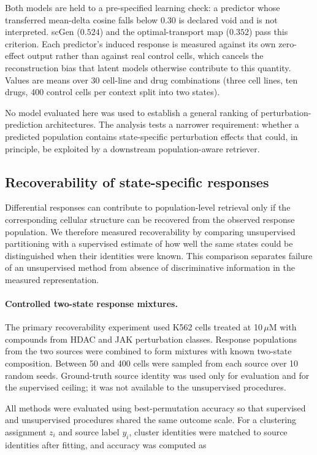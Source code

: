 \documentclass[11pt,letterpaper]{article}
\begin{document}
Both models are held to a pre-specified learning check: a predictor whose transferred mean-delta
cosine falls below 0.30 is declared void and is not interpreted. scGen ($0.524$) and the
optimal-transport map ($0.352$) pass this criterion. Each
predictor's induced response is measured against its own zero-effect output rather than against
real control cells, which cancels the reconstruction bias that latent models otherwise contribute
to this quantity. Values are means over 30 cell-line and drug combinations (three cell lines, ten
drugs, 400 control cells per context split into two states).

No model evaluated here was used to establish a general ranking of perturbation-prediction
architectures. The analysis tests a narrower requirement: whether a predicted population contains
state-specific perturbation effects that could, in principle, be exploited by a downstream
population-aware retriever.



\subsection*{Recoverability of state-specific responses}

Differential responses can contribute to population-level retrieval only if the corresponding
cellular structure can be recovered from the observed response population. We therefore measured
recoverability by comparing unsupervised partitioning with a supervised estimate of how well the
same states could be distinguished when their identities were known. This comparison separates
failure of an unsupervised method from absence of discriminative information in the measured
representation.

\paragraph{Controlled two-state response mixtures.}
The primary recoverability experiment used K562 cells treated at 10\,$\mu$M with compounds from
HDAC and JAK perturbation classes. Response populations from the two sources were combined to form
mixtures with known two-state composition. Between 50 and 400 cells were sampled from each source
over 10 random seeds. Ground-truth source identity was used only for evaluation and for the
supervised ceiling; it was not available to the unsupervised procedures.

All methods were evaluated using best-permutation accuracy so that supervised and unsupervised
procedures shared the same outcome scale. For a clustering assignment $z_i$ and source label
$y_i$, cluster identities were matched to source identities after fitting, and accuracy was
computed as
\end{document}
